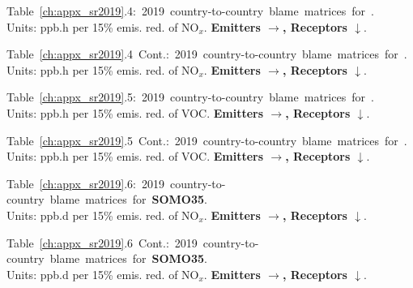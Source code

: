 \footnotesize{\mbox{Table \ref{ch:appx_sr2019}.4: 2019 country-to-country blame matrices for \textbf{\aotucf}.}\\ Units: ppb.h per 15\% emis. red. of NO$_x$. \textbf{Emitters $\rightarrow$, Receptors $\downarrow$}. }\\[\baselineskip]\enlargethispage{\myenlarge} \hspace{-0.5cm} 
\centerline{}\clearpage
\footnotesize{\mbox{Table \ref{ch:appx_sr2019}.4 Cont.: 2019 country-to-country blame matrices for \textbf{\aotucf}.}\\ Units: ppb.h per 15\% emis. red. of NO$_x$. \textbf{Emitters $\rightarrow$, Receptors $\downarrow$}. }\\[\baselineskip]\enlargethispage{\myenlarge} \hspace{-0.5cm} 
\centerline{}\clearpage

\footnotesize{\mbox{Table \ref{ch:appx_sr2019}.5: 2019 country-to-country blame matrices for \textbf{\aotucf}.}\\ Units: ppb.h per 15\% emis. red. of VOC. \textbf{Emitters $\rightarrow$, Receptors $\downarrow$}. }\\[\baselineskip]\enlargethispage{\myenlarge} \hspace{-0.5cm} 
\centerline{}\clearpage
\footnotesize{\mbox{Table \ref{ch:appx_sr2019}.5 Cont.: 2019 country-to-country blame matrices for \textbf{\aotucf}.}\\ Units: ppb.h per 15\% emis. red. of VOC. \textbf{Emitters $\rightarrow$, Receptors $\downarrow$}. }\\[\baselineskip]\enlargethispage{\myenlarge} \hspace{-0.5cm} 
\centerline{}\clearpage

\footnotesize{\mbox{Table \ref{ch:appx_sr2019}.6: 2019 country-to-country blame matrices for \textbf{SOMO35}.}\\ Units: ppb.d per 15\% emis. red. of NO$_x$. \textbf{Emitters $\rightarrow$, Receptors $\downarrow$}. }\\[\baselineskip]\enlargethispage{\myenlarge} \hspace{-0.5cm} 
\centerline{}\clearpage
\footnotesize{\mbox{Table \ref{ch:appx_sr2019}.6 Cont.: 2019 country-to-country blame matrices for \textbf{SOMO35}.}\\ Units: ppb.d per 15\% emis. red. of NO$_x$. \textbf{Emitters $\rightarrow$, Receptors $\downarrow$}. }\\[\baselineskip]\enlargethispage{\myenlarge} \hspace{-0.5cm} 
\centerline{}\clearpage


